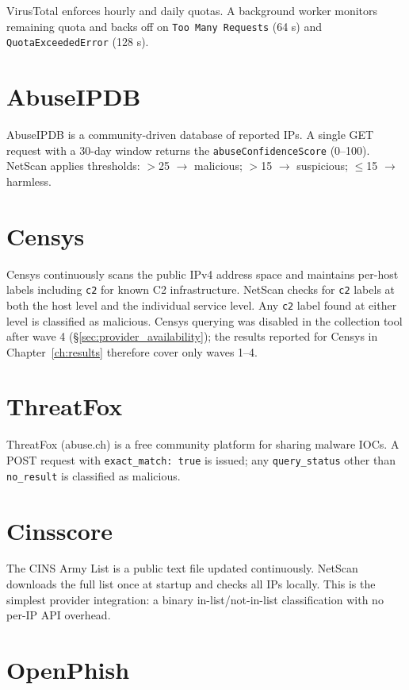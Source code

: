 \documentclass[12pt, a4paper, twoside]{report}
\begin{document}
VirusTotal enforces hourly and daily quotas. A background worker monitors remaining quota and
backs off on \texttt{Too Many Requests} (64 s) and \texttt{QuotaExceededError} (128 s).

\section{AbuseIPDB}

AbuseIPDB is a community-driven database of reported IPs. A single GET request with a 30-day
window returns the \texttt{abuseConfidenceScore} (0--100). NetScan applies thresholds:
$>$25 $\to$ malicious; $>$15 $\to$ suspicious; $\leq$15 $\to$ harmless.

\section{Censys}

Censys continuously scans the public IPv4 address space and maintains per-host labels including
\texttt{c2} for known C2 infrastructure. NetScan checks for \texttt{c2} labels at both the host
level and the individual service level. Any \texttt{c2} label found at either level is classified
as malicious. Censys querying was disabled in the collection tool after wave 4
(\S\ref{sec:provider_availability}); the results reported for Censys in Chapter~\ref{ch:results}
therefore cover only waves 1--4.

\section{ThreatFox}

ThreatFox (abuse.ch) is a free community platform for sharing malware IOCs. A POST request with
\texttt{exact\_match: true} is issued; any \texttt{query\_status} other than \texttt{no\_result}
is classified as malicious.

\section{Cinsscore}

The CINS Army List is a public text file updated continuously. NetScan downloads the full list
once at startup and checks all IPs locally. This is the simplest provider integration: a binary
in-list/not-in-list classification with no per-IP API overhead.

\section{OpenPhish}
\end{document}
